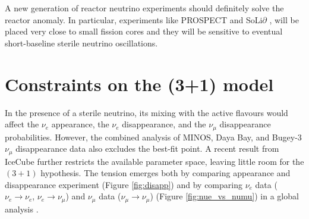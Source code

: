     A new generation of reactor neutrino experiments should definitely solve the reactor anomaly. In particular, experiments like PROSPECT \cite{Ashenfelter:2015uxt} and SoLi$\partial$ \cite{Abreu:2017bpe}, will be placed very close to small fission cores and they will be sensitive to eventual short-baseline sterile neutrino oscillations.

\section{Constraints on the (3+1) model}

In the presence of a sterile neutrino, its mixing with the active flavours would affect the $\nu_e$ appearance, the $\nu_e$ disappearance, and the $\nu_{\mu}$ disappearance probabilities. However, the combined analysis of MINOS, Daya Bay, and Bugey-3 $\nu_{\mu}$ disappearance data \cite{Adamson:2016jku} also excludes the best-fit point. A recent result from IceCube \cite{TheIceCube:2016oqi} further restricts the available parameter space, leaving little room for the $(3+1)$ hypothesis. 
The tension emerges both by comparing appearance and disappearance experiment (Figure \ref{fig:disapp}) and by comparing $\nu_e$ data ($\nu_e\rightarrow\nu_e$, $\nu_e\rightarrow\nu_{\mu}$) and $\nu_{\mu}$ data ($\nu_{\mu}\rightarrow\nu_{\mu}$) (Figure \ref{fig:nue_vs_numu}) in a global analysis \cite{Dentler:2018sju}.

